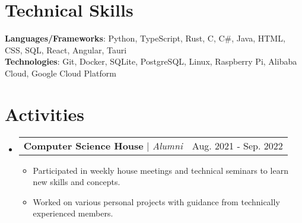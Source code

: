 \documentclass[letterpaper,11pt]{article}
\makeatletter
\newcommand{\resumeItem}[1]{
  \item\small{
    {#1 \vspace{-2pt}}
  }
}
\newcommand{\resumeProjectHeading}[2]{
    \item
    \begin{tabular*}{0.97\textwidth}{l@{\extracolsep{\fill}}r}
      \small#1 & #2 \\
    \end{tabular*}\vspace{-7pt}
}
\newcommand{\resumeSubHeadingListStart}{\begin{itemize}[leftmargin=0.15in, label={}]}
\newcommand{\resumeSubHeadingListEnd}{\end{itemize}}
\newcommand{\resumeItemListStart}{\begin{itemize}}
\newcommand{\resumeItemListEnd}{\end{itemize}\vspace{-5pt}}
\makeatother
\begin{document}
\section{Technical Skills}
 \begin{itemize}[leftmargin=0.15in, label={}]
    \small{\item{
     \textbf{Languages/Frameworks}{: Python, TypeScript, Rust, C, C\#, Java, HTML, CSS, SQL, React, Angular, Tauri} \\
     \textbf{Technologies}{: Git, Docker, SQLite, PostgreSQL, Linux, Raspberry Pi, Alibaba Cloud, Google Cloud Platform} \\
    }}
 \end{itemize}

 
\section{Activities}
    \resumeSubHeadingListStart
    \resumeProjectHeading
        {\textbf{Computer Science House} $|$ \textit{Alumni}}{Aug. 2021 - Sep. 2022}
        \resumeItemListStart
            \resumeItem {Participated in weekly house meetings and technical seminars to learn new skills and concepts.}
            \resumeItem {Worked on various personal projects with guidance from technically experienced members.}
        \resumeItemListEnd
    \resumeSubHeadingListEnd

\end{document}

